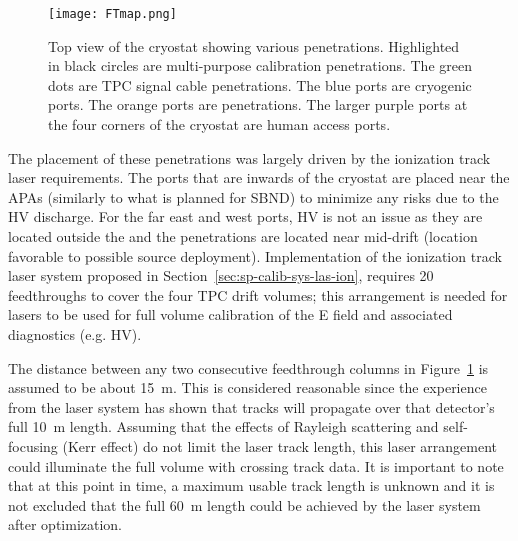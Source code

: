 \begin{figure}[tbp]
\centering
\texttt{[image: FTmap.png]}
\caption{Top view of the \spmod %
cryostat showing various penetrations. Highlighted in black circles are multi-purpose calibration penetrations. The green dots are TPC signal cable penetrations. The blue ports are cryogenic ports. The orange ports are  penetrations. The larger purple ports at the four corners of the cryostat are human access ports.}
\label{fig:ftmap}
\end{figure}

The placement of these penetrations was largely driven by the ionization track laser %
requirements. The ports that are inwards of the cryostat are placed near the APAs (similarly to what is planned for SBND) to minimize any risks due to the HV discharge. For the far east and west ports, HV is not an issue as they are located outside the  and the penetrations are located near mid-drift (location favorable to possible source deployment).
Implementation of the ionization track laser system proposed in Section~\ref{sec:sp-calib-sys-las-ion}, requires 20 feedthroughs to cover the four TPC drift volumes; this arrangement is needed for lasers to be used for full volume calibration of the E field and associated diagnostics (e.g. HV). 

The distance between any two consecutive feedthrough columns in Figure~\ref{fig:ftmap} is assumed to be about \SI{15}{\m}. This is considered reasonable since the experience from the \microboone laser system has shown that tracks will propagate over that detector's full \SI{10}{\m} length. Assuming that the effects of Rayleigh scattering and self-focusing (Kerr effect) do not limit the laser track length, this laser arrangement could illuminate the full volume with crossing track data.  It is important to note that at this point in time, a maximum usable track length is unknown and it is not excluded that the full \SI{60}{\m} \detmodule length could be achieved by the laser system after optimization.


